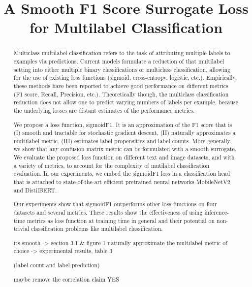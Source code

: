 \documentclass[sigconf,natbib,screen=true,review=true,anonymous]{acmart}
\begin{document}
\title[A Smooth F1 Score Surrogate Loss for Multilabel Classification]{A Smooth F1 Score Surrogate Loss for Multilabel Classification}


\begin{abstract}

  Multiclass multilabel classification refers to the task of attributing multiple labels to examples via predictions. Current models formulate a reduction of that multilabel setting into either multiple binary classifications or multiclass classification, allowing for the use of existing loss functions (sigmoid, cross-entropy, logistic, etc.). Empirically, these methods have been reported to achieve good performance on different metrics (F1 score, Recall, Precision, etc.). Theoretically though, the multiclass classification reduction does not allow one to predict varying numbers of labels per example, because the underlying losses are distant estimates of the performance metrics.

  We propose a loss function, sigmoidF1. It is an approximation of the F1 score that is (I) smooth and tractable for stochastic gradient descent, (II) naturally approximates a multilabel metric, (III) estimates label propensities and label counts. More generally, we show that any confusion matrix metric can be formulated with a smooth surrogate. We evaluate the proposed loss function on different text and image datasets, and with a variety of metrics, to account for the complexity of mutilabel classification evaluation. In our experiments, we embed the sigmoidF1 loss in a classification head that is attached to state-of-the-art efficient pretrained neural networks MobileNetV2 and DistilBERT.

Our experiments show that sigmoidF1 outperforms other loss functions on four datasets and several metrics. These results show the effectiveness of using inference-time metrics as loss function at training time in general and their potential on non-trivial classification problems like multilabel classification.

its smooth -> section 3.1 & figure 1
naturally approximate the multilabel metric of choice -> experimental results, table 3

(label count and label prediction)

maybe remove the correlation claim YES


\end{abstract}
\end{document}
